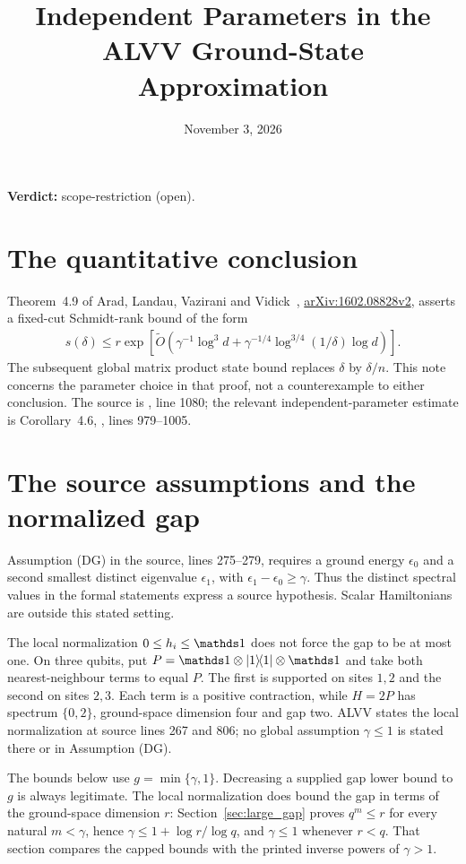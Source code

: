\documentclass{article}
\title{Independent Parameters in the ALVV Ground-State Approximation}
\author{}
\date{November 3, 2026}
\providecommand{\gapnote}[2]{\par\noindent\textbf{Verdict:} #1 (#2).\par}
\begin{document}
\maketitle
\gapnote{scope-restriction}{open}

\section{The quantitative conclusion}

Theorem~4.9 of Arad, Landau, Vazirani and Vidick~\cite{Arad2016RigorousRG},
\href{https://arxiv.org/abs/1602.08828v2}{arXiv:1602.08828v2}, asserts a
fixed-cut Schmidt-rank bound of the form
\begin{align}
    s(\delta)\le r\exp\!\left[\widetilde O\!\left(
        \gamma^{-1}\log^3d+
        \gamma^{-1/4}\log^{3/4}(1/\delta)\log d\right)\right].
    \label{eq:alvv_approximation_rank}
\end{align}
The subsequent global matrix product state bound replaces $\delta$ by
$\delta/n$. This note concerns the parameter choice in that proof, not a
counterexample to either conclusion.
The source is , line 1080; the relevant
independent-parameter estimate is Corollary~4.6,
, lines 979--1005.

\section{The source assumptions and the normalized gap}

Assumption (DG) in the source, lines 275--279, requires a ground energy
$\epsilon_0$ and a second smallest distinct eigenvalue $\epsilon_1$, with
$\epsilon_1-\epsilon_0\ge\gamma$. Thus the distinct spectral values in the
formal statements express a source hypothesis. Scalar Hamiltonians are
outside this stated setting.

The local normalization $0\le h_i\le\Id$ does not force the gap to be at
most one. On three qubits, put
$P=\Id\otimes\ketbra{1}{1}\otimes\Id$ and take both nearest-neighbour
terms to equal $P$. The first is supported on sites $1,2$ and the second
on sites $2,3$. Each term is a positive contraction, while
$H=2P$ has spectrum $\{0,2\}$, ground-space dimension four and gap two.
ALVV states the local normalization at source lines 267 and 806; no
global assumption $\gamma\le1$ is stated there or in Assumption (DG).

The bounds below use $g=\min\{\gamma,1\}$. Decreasing a supplied gap
lower bound to $g$ is always legitimate. The local normalization does bound
the gap in terms of the ground-space dimension $r$: Section~\ref{sec:large_gap}
proves $q^m\le r$ for every natural $m<\gamma$, hence
$\gamma\le1+\log r/\log q$, and $\gamma\le1$ whenever $r<q$. That section
compares the capped bounds with the printed inverse powers of $\gamma>1$.
\end{document}
